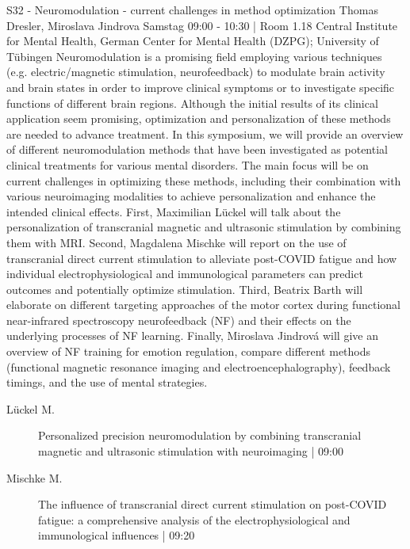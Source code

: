 
            \begin{symposium}
            {S32 - Neuromodulation - current challenges in method optimization}
            {Thomas Dresler, Miroslava Jindrova}
            {Samstag 09:00 - 10:30 | Room 1.18}
            {Central Institute for Mental Health, German Center for Mental Health (DZPG); University of Tübingen}
            Neuromodulation is a promising field employing various techniques (e.g. electric/magnetic stimulation, neurofeedback) to modulate brain activity and brain states in order to improve clinical symptoms or to investigate specific functions of different brain regions. Although the initial results of its clinical application seem promising, optimization and personalization of these methods are needed to advance treatment. In this symposium, we will provide an overview of different neuromodulation methods that have been investigated as potential clinical treatments for various mental disorders. The main focus will be on current challenges in optimizing these methods, including their combination with various neuroimaging modalities to achieve personalization and enhance the intended clinical effects. First, Maximilian Lückel will talk about the personalization of transcranial magnetic and ultrasonic stimulation by combining them with MRI. Second, Magdalena Mischke will report on the use of transcranial direct current stimulation to alleviate post-COVID fatigue and how individual electrophysiological and immunological parameters can predict outcomes and potentially optimize stimulation. Third, Beatrix Barth will elaborate on different targeting approaches of the motor cortex during functional near-infrared spectroscopy neurofeedback (NF) and their effects on the underlying processes of NF learning. Finally, Miroslava Jindrová will give an overview of NF training for emotion regulation, compare different methods (functional magnetic resonance imaging and electroencephalography), feedback timings, and the use of mental strategies.
            \begin{description}    
            
                \item [ Lückel M.] Personalized precision neuromodulation by combining transcranial magnetic and ultrasonic stimulation with neuroimaging \textcolor{mygray}{ | 09:00}    
                
                \item [ Mischke M.] The influence of transcranial direct current stimulation on post-COVID fatigue: a comprehensive analysis of the electrophysiological and immunological influences \textcolor{mygray}{ | 09:20}    
                

\end{description}
\end{symposium}
